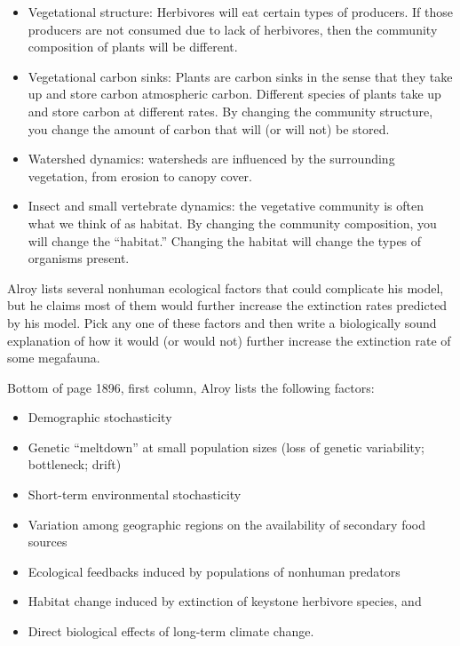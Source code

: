 \documentclass[11pt]{exam}
\begin{document}
\begin{questions}
\begin{itemize}
\itemsep1pt\parskip0pt
\item
  Vegetational structure: Herbivores will eat certain types of
  producers. If those producers are not consumed due to lack of
  herbivores, then the community composition of plants will be
  different.
\item
  Vegetational carbon sinks: Plants are carbon sinks in the sense that
  they take up and store carbon atmospheric carbon. Different species of
  plants take up and store carbon at different rates. By changing the
  community structure, you change the amount of carbon that will (or
  will not) be stored.
\item
  Watershed dynamics: watersheds are influenced by the surrounding
  vegetation, from erosion to canopy cover.
\item
  Insect and small vertebrate dynamics: the vegetative community is
  often what we think of as habitat. By changing the community
  composition, you will change the ``habitat.'' Changing the habitat
  will change the types of organisms present.
\end{itemize}
\else{}
\fi

\question[5]
Alroy lists several nonhuman ecological factors that could complicate
his model, but he claims most of them would further increase the
extinction rates predicted by his model. Pick any one of these factors
and then write a biologically sound explanation of how it would (or
would not) further increase the extinction rate of some megafauna.

\ifprintanswers
Bottom of page 1896, first column, Alroy lists the following factors:

\begin{itemize}
\itemsep1pt\parskip0pt
\item
  Demographic stochasticity
\item
  Genetic ``meltdown'' at small population sizes (loss of genetic
  variability; bottleneck; drift)
\item
  Short-term environmental stochasticity
\item
  Variation among geographic regions on the availability of secondary
  food sources
\item
  Ecological feedbacks induced by populations of nonhuman predators
\item
  Habitat change induced by extinction of keystone herbivore species,
  and
\item
  Direct biological effects of long-term climate change.
\end{itemize}
\else{}
\fi



\end{questions}
\end{document}
